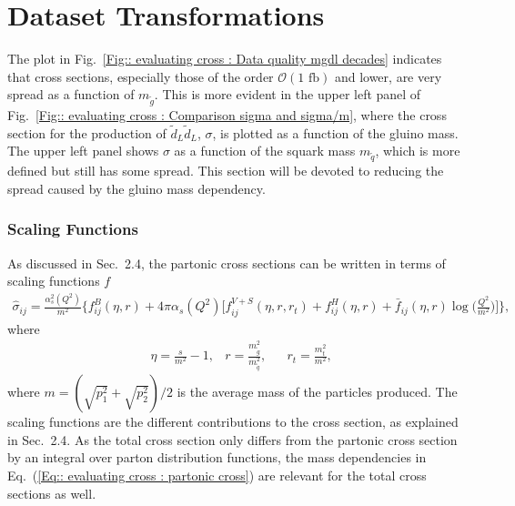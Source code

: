 \documentclass[twoside,english]{uiofysmaster}
\begin{document}
\section{Dataset Transformations}

The plot in Fig.~\ref{Fig:: evaluating cross : Data quality mgdl decades} indicates that cross sections, especially those of the order $\mathcal{O}(1 \text{ fb})$ and lower, are very spread as a function of $m_{\tilde{g}}$. This is more evident in the upper left panel of Fig.~\ref{Fig:: evaluating cross : Comparison sigma and sigma/m}, where the cross section for the production of $\tilde{d}_L \tilde{d}_L$, $\sigma$, is plotted as a function of the gluino mass. The upper left panel shows $\sigma$ as a function of the squark mass $m_{\tilde{q}}$, which is more defined but still has some spread. This section will be devoted to reducing the spread caused by the gluino mass dependency.

\subsubsection{Scaling Functions}

As discussed in Sec.~2.4, the partonic cross sections can be written in terms of scaling functions $f$
\begin{align}\label{Eq:: evaluating cross : partonic cross}
\hat{\sigma}_{ij} = \frac{\alpha^2_s (Q^2)}{m^2} \Bigg\{ f^B_{ij}(\eta, r) + 4 \pi \alpha_s (Q^2) \Bigg[ f^{V+S}_{ij}(\eta, r, r_t) + f^H_{ij}(\eta, r) + \bar{f}_{ij} (\eta, r) \log \Big( \frac{Q^2}{m^2} \Big) \Bigg] \Bigg\},
\end{align}
where 
\begin{align*}
&\eta = \frac{s}{m^2} - 1, &r = \frac{m_{\tilde{g}}^2}{m_{\tilde{q}}^2}, &&r_t = \frac{m_t^2}{m^2},
\end{align*}
where $m = (\sqrt{p_1^2} + \sqrt{p_2^2} )/2$ is the average mass of the particles produced. The scaling functions are the different contributions to the cross section, as explained in Sec.~2.4. As the total cross section only differs from the partonic cross section by an integral over parton distribution functions, the mass dependencies in Eq.~(\ref{Eq:: evaluating cross : partonic cross}) are relevant for the total cross sections as well.
\end{document}
